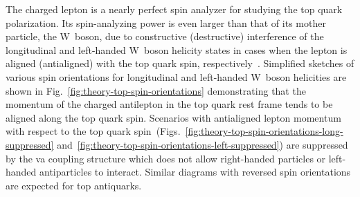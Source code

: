 
The charged lepton is a nearly perfect spin analyzer for studying the top quark polarization. Its spin-analyzing power is even larger than that of its mother particle, the $\mathrm{W}$~boson, due to constructive (destructive) interference of the longitudinal and left-handed $\mathrm{W}$~boson helicity states in cases when the lepton is aligned (antialigned) with the top quark spin, respectively~\cite{Bernreuther:2008ju}. Simplified sketches of various spin orientations for longitudinal and left-handed $\mathrm{W}$~boson helicities are shown in Fig.~\ref{fig:theory-top-spin-orientations} demonstrating that the momentum of the charged antilepton in the top quark rest frame tends to be aligned along the top quark spin. Scenarios with antialigned lepton momentum with respect to the top quark spin~(Figs.~\ref{fig:theory-top-spin-orientations-long-suppressed} and~\ref{fig:theory-top-spin-orientations-left-suppressed}) are suppressed by the \gls{va} coupling structure which does not allow right-handed particles or left-handed antiparticles to interact. Similar diagrams with reversed spin orientations are expected for top antiquarks.

